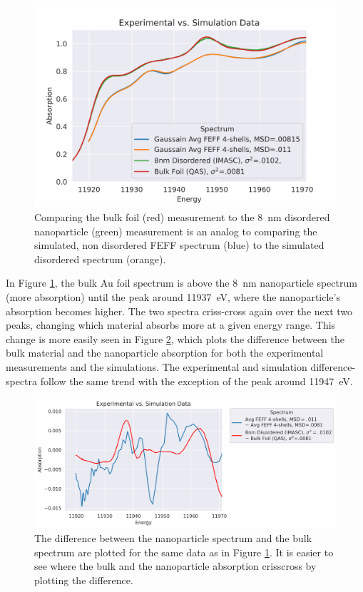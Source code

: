 \begin{figure}[h]
	\centering
	\includegraphics[width=.75\linewidth]{Chapters/Figures/updated_bulk_8nm_disorder_experimental_theory_comparison.png}
	\caption[Simulation vs. Experimental]{Comparing the bulk foil (red) measurement to the 8~nm disordered nanoparticle (green) measurement is an analog to comparing the simulated, non disordered FEFF spectrum (blue) to the simulated disordered spectrum (orange).}
	\label{fig:avg-experimental-vs-simulation}
\end{figure}

In Figure \ref{fig:avg-experimental-vs-simulation}, the bulk Au foil spectrum is above the 8~nm nanoparticle spectrum (more absorption) until the peak around 11937~eV, where the nanoparticle's absorption becomes higher. The two spectra criss-cross again over the next two peaks, changing which material absorbs more at a given energy range. This change is more easily seen in Figure \ref{fig:avg-experimential-vs-simulation-difference}, which plots the difference between the bulk material and the nanoparticle absorption for both the experimental measurements and the simulations. The experimental and simulation difference-spectra follow the same trend with the exception of the peak around 11947~eV.


\begin{figure}[h!]
	\centering
	\includegraphics[width=\linewidth]{Chapters/Figures/experimental_vs_simulation_delta.png}
	\caption[Bulk-nanoparticle difference: Simulation vs. Experimental data]{The difference between the nanoparticle spectrum and the bulk spectrum are plotted for the same data as in Figure \ref{fig:avg-experimental-vs-simulation}. It is easier to see where the bulk and the nanoparticle absorption crisscross by plotting the difference.}
	\label{fig:avg-experimential-vs-simulation-difference}
\end{figure}

